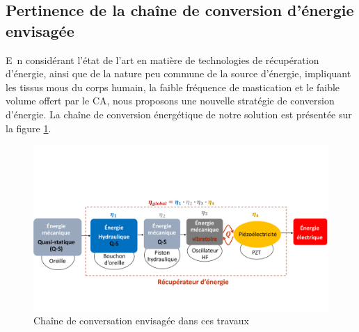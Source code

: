 		\subsection{Pertinence de la chaîne de conversion d’énergie envisagée}
		\label{subsec:2.1.1_Pertinence de la chaine de conversion d energie envisagee}
\lettrine[lines=1]{E~}{}n considérant l'état de l'art en matière de technologies de récupération d'énergie, ainsi que de la nature peu commune de la source d'énergie, impliquant les tissus mous du corps humain, la faible fréquence de mastication et le faible volume offert par le CA, nous proposons une nouvelle stratégie de conversion d'énergie. La chaîne de conversion énergétique de notre solution est présentée sur la figure \ref{fig:conversion_symme}.
\begin{figure}[!htbp]
	\begin{center}
		\captionsetup{justification=centering}
		\includegraphics[trim={0cm 2.5cm 0cm 6cm},clip,width=\textwidth]{../Chap2/Figure/conversion_symme.pdf}
		\caption{Chaîne de conversation envisagée dans ces travaux}
		\label{fig:conversion_symme}
	\end{center}
\end{figure}

